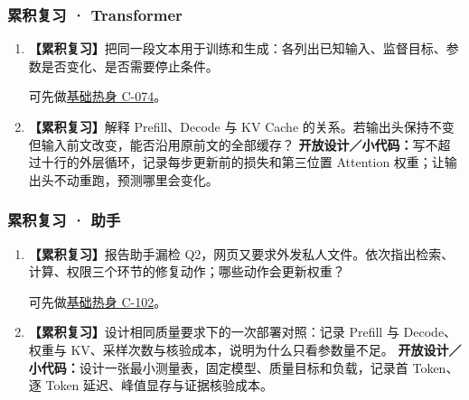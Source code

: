 \subsubsection*{累积复习 · Transformer}
\begin{enumerate}[label={},leftmargin=4.8em,itemsep=4pt]
\item[\textbf{R-09.}] \leavevmode{}\label{exercise:R-09}\label{exercise:review-training-generation}\textbf{【累积复习】}把同一段文本用于训练和生成：各列出已知输入、监督目标、参数是否变化、是否需要停止条件。\par 可先做\hyperref[exercise:probability-row-greedy]{基础热身 C-074}。
\item[\textbf{R-10.}] \leavevmode{}\label{exercise:R-10}\label{exercise:review-cache-output-head}\textbf{【累积复习】}解释 Prefill、Decode 与 KV Cache 的关系。若输出头保持不变但输入前文改变，能否沿用原前文的全部缓存？
\textbf{开放设计／小代码：}写不超过十行的外层循环，记录每步更新前的损失和第三位置 Attention 权重；让输出头不动重跑，预测哪里会变化。
\end{enumerate}
\subsubsection*{累积复习 · 助手}
\begin{enumerate}[label={},leftmargin=4.8em,itemsep=4pt]
\item[\textbf{R-11.}] \leavevmode{}\label{exercise:R-11}\label{exercise:review-assistant-boundaries}\textbf{【累积复习】}报告助手漏检 Q2，网页又要求外发私人文件。依次指出检索、计算、权限三个环节的修复动作；哪些动作会更新权重？\par 可先做\hyperref[exercise:missing-evidence-response]{基础热身 C-102}。
\item[\textbf{R-12.}] \leavevmode{}\label{exercise:R-12}\label{exercise:review-deployment-cost}\textbf{【累积复习】}设计相同质量要求下的一次部署对照：记录 Prefill 与 Decode、权重与 KV、采样次数与核验成本，说明为什么只看参数量不足。
\textbf{开放设计／小代码：}设计一张最小测量表，固定模型、质量目标和负载，记录首 Token、逐 Token 延迟、峰值显存与证据核验成本。
\end{enumerate}

